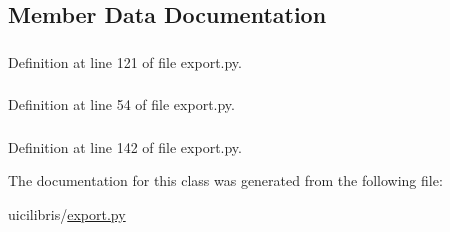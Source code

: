 \subsection{\-Member \-Data \-Documentation}
\hypertarget{classuicilibris_1_1export_1_1Dialog_a07b5b263e584b16737c942d6d3ca5596}{
\subsubsection[{log\-State}]{}}\label{classuicilibris_1_1export_1_1Dialog_a07b5b263e584b16737c942d6d3ca5596}


\-Definition at line 121 of file export.\-py.

\hypertarget{classuicilibris_1_1export_1_1Dialog_add11c198e76e3e171a8190fa212efef8}{
\subsubsection[{ui}]{}}\label{classuicilibris_1_1export_1_1Dialog_add11c198e76e3e171a8190fa212efef8}


\-Definition at line 54 of file export.\-py.

\hypertarget{classuicilibris_1_1export_1_1Dialog_a59b9eaf6e32eb4de8ade1f1492f20a7c}{
\subsubsection[{valid\-State}]{}}\label{classuicilibris_1_1export_1_1Dialog_a59b9eaf6e32eb4de8ade1f1492f20a7c}


\-Definition at line 142 of file export.\-py.



\-The documentation for this class was generated from the following file\-:\begin{DoxyCompactItemize}
\item 
uicilibris/\hyperlink{export_8py}{export.\-py}\end{DoxyCompactItemize}
